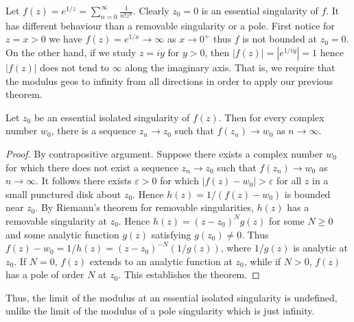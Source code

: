 \begin{example}
    Let $f(z) = e^{1/z} = \sum_{n=0}^{\infty}\frac{1}{n!z^n}$. Clearly $z_0 = 0$ is an essential singularity of $f$. It has different behaviour than a removable singularity or a pole. First notice for $z = x > 0$ we have $f(z) = e^{1/x}\rightarrow \infty$ as $x\rightarrow 0^+$ thus $f$ is not bounded at $z_0 = 0$. On the other hand, if we study $z = iy$ for $y > 0$, then $|f(z)| = |e^{1/iy}| = 1$ hence $|f(z)|$ does not tend to $\infty$ along the imaginary axis. That is, we require that the modulus geos to infinity from all directions in order to apply our previous theorem.
\end{example}

\begin{theorem}
    Let $z_0$ be an essential isolated singularity of $f(z)$. Then for every complex number $w_0$, there is a sequence $z_n \rightarrow z_0$ such that $f(z_n)\rightarrow w_0$ as $n\rightarrow \infty$.
\end{theorem}
\begin{proof}
    By contrapositive argument. Suppose there exists a complex number $w_0$ for which there does not exist a sequence $z_n\rightarrow z_0$ such that $f(z_n)\rightarrow w_0$ as $n\rightarrow \infty$. It follows there exists $\varepsilon > 0$ for which $|f(z) - w_0| > \varepsilon$ for all $z$ in a small punctured disk about $z_0$. Hence $h(z) = 1/(f(z)-w_0)$ is bounded near $z_0$. By Riemann's theorem for removable singularities, $h(z)$ has a removable singularity at $z_0$. Hence $h(z) = (z-z_0)^Ng(z)$ for some $N \geq 0$ and some analytic function $g(z)$ satisfying $g(z_0) \neq 0$. Thus $f(z) - w_0 = 1/h(z) = (z-z_0)^{-N}(1/g(z))$, where $1/g(z)$ is analytic at $z_0$. If $N = 0$, $f(z)$ extends to an analytic function at $z_0$, while if $N > 0$, $f(z)$ has a pole of order $N$ at $z_0$. This establishes the theorem.
\end{proof}

Thus, the limit of the modulus at an essential isolated singularity is undefined, unlike the limit of the modulus of a pole singularity which is just infinity.

